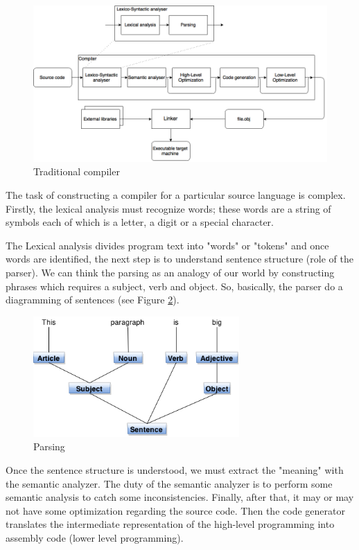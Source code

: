 \documentclass[
  oneside,
  11pt, a4paper,
  footinclude=true,
  headinclude=true,
  cleardoublepage=empty
]{scrbook}
\begin{document}
\begin{figure}
\begin{center}
       \includegraphics[width=1\textwidth]{img/compiler.png}
\end{center}
\caption{Traditional compiler}
\label{fig:compiler}
\end{figure}
\newpage
The task of constructing a compiler for a particular source language is complex. Firstly, the lexical analysis must recognize words; these words are a string of symbols each of which is a letter, a digit or a special character.

The Lexical analysis divides program text into "words" or "tokens" and once words are identified, the next step is to understand sentence structure (role of the parser).
We can think the parsing as an analogy of our world by constructing phrases which requires a subject, verb and object. So, basically, the parser do a diagramming of sentences (see Figure \ref{fig:parsing}).
\begin{figure}
\begin{center}
       \includegraphics[width=0.7\textwidth]{img/parsing.png}
\end{center}
\caption{Parsing}
\label{fig:parsing}
\end{figure}
Once the sentence structure is understood, we must extract the "meaning" with the semantic analyzer.
The duty of the semantic analyzer is to perform some semantic analysis to catch some inconsistencies.
Finally, after that, it may or may not have some optimization regarding the source code. Then the code generator translates the intermediate representation of the high-level programming into assembly code (lower level programming).
\newpage
\end{document}
